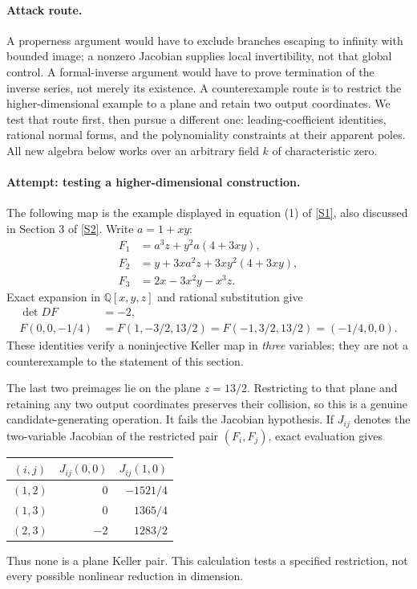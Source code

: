\documentclass[11pt]{article}
\newcommand{\Q}{\mathbb{Q}}
\newcommand{\sref}[2]{\hyperlink{source:#1:#2}{[S#2]}}
\begin{document}
\paragraph{Attack route.}
A properness argument would have to exclude branches escaping to infinity
with bounded image; a nonzero Jacobian supplies local invertibility, not that
global control. A formal-inverse argument would have to prove termination of
the inverse series, not merely its existence. A counterexample route is to
restrict the higher-dimensional example to a plane and retain two output
coordinates. We test that route first, then pursue a different one:
leading-coefficient identities, rational normal forms, and the polynomiality
constraints at their apparent poles. All new algebra below works over an
arbitrary field $k$ of characteristic zero.

\paragraph{Attempt: testing a higher-dimensional construction.}
The following map is the example displayed in equation (1) of
\sref{statement}{1}, also discussed in Section 3 of \sref{statement}{2}. Write $a=1+xy$:
\begin{equation}\label{statement:threeD}
 \begin{aligned}
 F_1&=a^3z+y^2a(4+3xy),\\
 F_2&=y+3xa^2z+3xy^2(4+3xy),\\
 F_3&=2x-3x^2y-x^3z.
 \end{aligned}
\end{equation}
Exact expansion in $\Q[x,y,z]$ and rational substitution give
\begin{align*}
 \det DF&=-2,\\
 F(0,0,-1/4)&=F(1,-3/2,13/2)=F(-1,3/2,13/2)
              =(-1/4,0,0).
\end{align*}
These identities verify a noninjective Keller map in \emph{three} variables;
they are not a counterexample to the statement of this section.

The last two preimages lie on the plane $z=13/2$. Restricting to that plane
and retaining any two output coordinates preserves their collision, so this
is a genuine candidate-generating operation. It fails the Jacobian
hypothesis. If $J_{ij}$ denotes the two-variable Jacobian of the restricted
pair $(F_i,F_j)$, exact evaluation gives
\begin{center}
\begin{tabular}{c|r r}
$(i,j)$ & $J_{ij}(0,0)$ & $J_{ij}(1,0)$\\
\hline
$(1,2)$ & $0$ & $-1521/4$\\
$(1,3)$ & $0$ & $1365/4$\\
$(2,3)$ & $-2$ & $1283/2$
\end{tabular}
\end{center}
Thus none is a plane Keller pair. This calculation tests a specified
restriction, not every possible nonlinear reduction in dimension.
\end{document}
